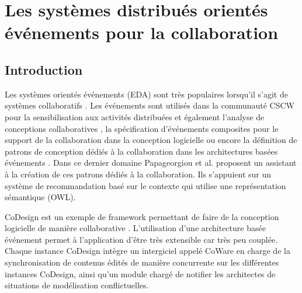 
\section{Les systèmes distribués orientés événements pour la collaboration}

	\subsection{Introduction}
Les systèmes orientés événements (\gls{EDA}) sont très populaires lorsqu'il s'agit 
de systèmes collaboratifs \cite{Helmer2011}. Les événements sont utilisés dans la 
communauté  \gls{CSCW} pour la sensibilisation aux activités distribuées 
\cite{Cai2014a} et également l'analyse de conceptions collaboratives 
\cite{Bang2017}, la spécification d'événements composites pour le support de la 
collaboration dans la conception logicielle \cite{Yuan2002} ou encore la définition 
de patrons de conception dédiés à la collaboration dans les architectures basées 
événements \cite{Verginadis2009}. Dans ce dernier domaine 
Papageorgiou et al. \cite{Papageorgiou2011} proposent un assistant à la 
création de ces patrons dédiés à la collaboration. Ils s'appuient sur un système de 
recommandation basé sur le contexte qui utilise une représentation sémantique 
(\gls{OWL}).

CoDesign est un exemple de \gls{framework} permettant de faire de la 
conception logicielle de manière collaborative \cite{Bang2010}. L'utilisation d'une 
architecture basée événement permet à l'application d'être très extensible car très 
peu couplée. Chaque instance CoDesign intègre un intergiciel appelé CoWare en 
charge de la synchronisation de contenus édités de manière concurrente sur les 
différentes instances CoDesign, ainsi qu'un module chargé de notifier les 
architectes de situations de modélisation conflictuelles. 


